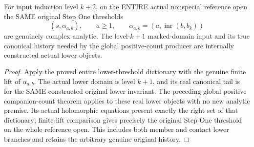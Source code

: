 \begin{theorem}
\label{hir:original-frozen-recursive-lower-next-positive-analytic-producer}
\leanok
{}
For input induction level $k+2$, on the ENTIRE actual nonspecial reference
open the SAME original Step One thresholds
\[
 (s,\alpha_{a,b}),\qquad a\ge1,\qquad
 \alpha_{a,b}=(a,\operatorname{inr}(b,b_k))
\]
are genuinely complex analytic. The level-$k+1$ marked-domain input and
its true canonical history needed by the global positive-count producer
are internally constructed actual lower objects.
\end{theorem}
\begin{proof}
Apply the proved entire lower-threshold dictionary with the genuine
finite lift of $\alpha_{a,b}$. The actual lower domain is level $k+1$,
and its real canonical tail is for the SAME constructed original lower
invariant. The preceding global positive companion-count theorem applies
to these real lower objects with no new analytic premise. Its actual
holomorphic equations present exactly the right set of that dictionary;
finite-lift comparison gives precisely the original Step One threshold
on the whole reference open. This includes both member and contact
lower branches and retains the arbitrary genuine original history.
\end{proof}

